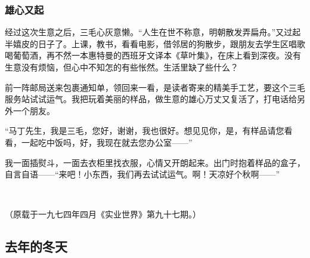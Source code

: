 \subsubsection*{雄心又起}
\par 经过这次生意之后，三毛心灰意懒。“人生在世不称意，明朝散发弄扁舟。”又过起半嬉皮的日子了。上课，教书，看看电影，借邻居的狗散步，跟朋友去学生区唱歌喝葡萄酒，再不然一本惠特曼的西班牙文译本《草叶集》，在床上看到深夜。没有生意没有烦恼，但心中不知怎的有些怅然。生活里缺了些什么？
\par 前一阵邮局送来包裹通知单，领回来一看，是读者寄来的精美手工艺，要这个三毛服务站试试运气。我把玩着美丽的样品，做生意的雄心万丈又复活了，打电话给另外一个朋友。
\par “马丁先生，我是三毛，您好，谢谢，我也很好。想见见你，是，有样品请您看看，一起吃中饭吗，好，我现在就去您办公室——”
\par 我一面插熨斗，一面去衣柜里找衣服，心情又开朗起来。出门时抱着样品的盒子，自言自语——“来吧！小东西，我们再去试试运气。啊！天凉好个秋啊——”
\par  
\par （原载于一九七四年四月《实业世界》第九十七期。）



\subsection{去年的冬天}


